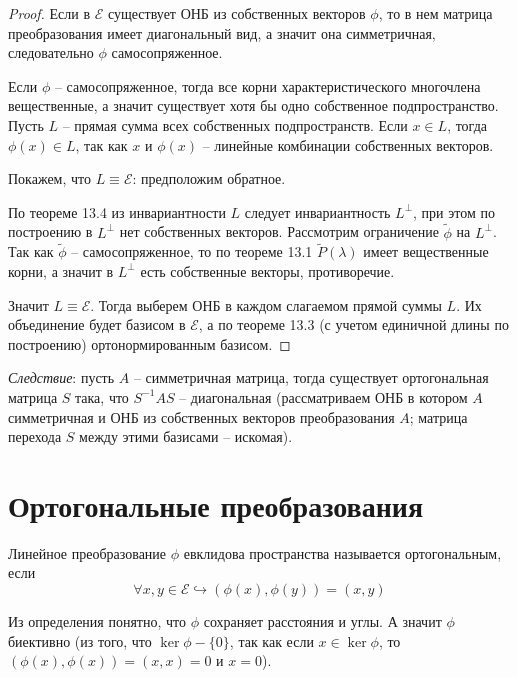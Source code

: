 \begin{proof}
    Если в $\mathcal{E}$ существует ОНБ из собственных векторов $\phi$, то в нем матрица преобразования имеет диагональный вид, а значит она симметричная, следовательно $\phi$ самосопряженное.

    Если $\phi$ -- самосопряженное, тогда все корни характеристического многочлена вещественные, а значит существует хотя бы одно собственное подпространство. Пусть $L$ -- прямая сумма всех собственных подпространств. Если $x\in L$, тогда $\phi(x)\in L$, так как $x$ и $\phi(x)$ -- линейные комбинации собственных векторов.

    Покажем, что $L\equiv \mathcal{E}$: предположим обратное.

    По теореме 13.4 из инвариантности $L$ следует инвариантность $L^{\bot}$, при этом по построению в $L^{\bot}$ нет собственных векторов. Рассмотрим ограничение ${\tilde\phi}$ на $L^{\bot}$. Так как $\tilde{\phi}$ -- самосопряженное, то по теореме 13.1 $\tilde{P}(\lambda)$ имеет вещественные корни, а значит в $L^{\bot}$ есть собственные векторы, противоречие.

    Значит $L\equiv \mathcal{E}$. Тогда выберем ОНБ в каждом слагаемом прямой суммы $L$. Их объединение будет базисом в $\mathcal{E}$, а по теореме 13.3 (с учетом единичной длины по построению) ортонормированным базисом.
\end{proof}
\textit{Следствие}: пусть $A$ -- симметричная матрица, тогда существует ортогональная матрица $S$ така, что $S^{-1}AS$ -- диагональная (рассматриваем ОНБ в котором $A$ симметричная и ОНБ из собственных векторов преобразования $A$; матрица перехода $S$ между этими базисами -- искомая).

\section{Ортогональные преобразования}
\begin{definition}
    Линейное преобразование $\phi$ евклидова пространства называется ортогональным, если
    \[
    \forall x,y\in \mathcal{E} \hookrightarrow (\phi(x),\phi(y))=(x,y)
    \]
\end{definition}

Из определения понятно, что $\phi$ сохраняет расстояния и углы. А значит $\phi$ биективно (из того, что $\ker \phi-\{0\}$, так как если $x\in\ker \phi$, то $(\phi(x),\phi(x))=(x,x)=0$ и $x=0$).

